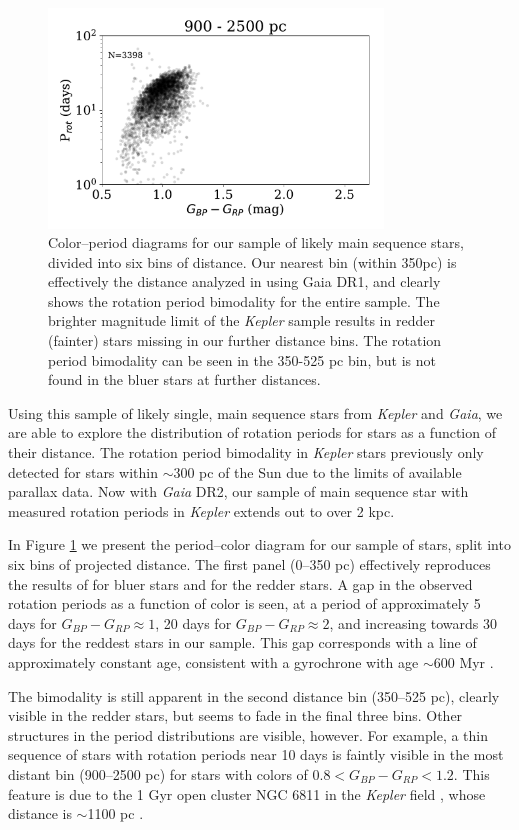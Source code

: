 \documentclass[preprint2]{aastex62}
\newcommand{\Kepler}{\textsl{Kepler}\xspace}
\begin{document}
\begin{figure}[]
\includegraphics[width=3.5in]{../figures/rot_dist_900}
\caption{Color--period diagrams for our sample of likely main sequence stars, divided into six bins of distance. Our nearest bin (within 350pc) is effectively the distance analyzed in \citet{davenport2017} using Gaia DR1, and clearly shows the rotation period bimodality for the entire sample. The brighter magnitude limit of the \Kepler sample results in redder (fainter) stars missing in our further distance bins. The rotation period bimodality can be seen in the 350-525 pc bin, but is not found in the bluer stars at further distances.
}
\label{fig:color_period}
\end{figure}

Using this sample of likely single, main sequence stars from \Kepler and {\em Gaia}, we are able to explore the distribution of rotation periods for stars as a function of their distance. The rotation period bimodality in \Kepler stars previously only detected for stars within $\sim$300 pc of the Sun due to the limits of available parallax data. Now with {\em Gaia} DR2, our sample of main sequence star with measured rotation periods in \Kepler extends out to over 2 kpc.

In Figure \ref{fig:color_period} we present the period--color diagram for our sample of stars, split into six bins of projected distance. The first panel (0--350 pc) effectively reproduces the results of \citet{davenport2017} for bluer stars and \citet{mcquillan2014} for the redder stars. A gap in the observed rotation periods as a function of color is seen, at a period of approximately 5 days for $G_{BP}-G_{RP}\approx1$, 20 days for $G_{BP}-G_{RP}\approx2$, and increasing towards 30 days for the reddest stars in our sample. This gap corresponds with a line of approximately constant age, consistent with a gyrochrone with age $\sim$600 Myr \citep{davenport2017}. 



The bimodality is still apparent in the second distance bin (350--525 pc), clearly visible in the redder stars, but seems to fade in the final three bins. Other structures in the period distributions are visible, however. For example, a thin sequence of stars with rotation periods near 10 days is faintly visible in the most distant bin (900--2500 pc) for stars with colors of $0.8<G_{BP}-G_{RP}<1.2$. This feature is due to the 1 Gyr open cluster NGC 6811 in the \Kepler field \citep{meibom2011}, whose distance is $\sim$1100 pc \citep{sandquist2016}.
\end{document}
